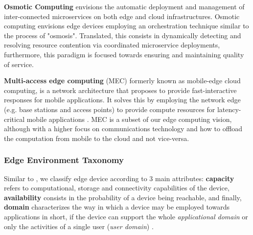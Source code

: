 \textbf{Osmotic Computing} \cite{villari2016osmotic} envisions the automatic deployment and management of inter-connected microservices on both edge and cloud infrastructures. Osmotic computing envisions edge devices employing an orchestration technique similar to the process of "osmosis". Translated, this consists in dynamically detecting and resolving resource contention via coordinated microservice deployments, furthermore, this paradigm is focused towards ensuring and maintaining quality of service.

\textbf{Multi-access edge computing} (MEC) formerly known as mobile-edge cloud computing, is a network architecture that proposes to provide fast-interactive responses for mobile applications. It solves this by employing the network edge (e.g. base stations and access points) to provide compute resources for latency-critical mobile applications \cite{mobile_edge_cloud}. MEC is a subset of our edge computing vision, although with a higher focus on communications technology and how to offload the computation from mobile to the cloud and not vice-versa. 

\subsubsection{Edge Environment Taxonomy} \label{subsec:edge_taxonomy}

Similar to \cite{Leitao2018}, we classify edge device according to 3 main attributes: \textbf{capacity} refers to computational, storage and connectivity capabilities of the device,  \textbf{availability} consists in the probability of a device being reachable, and finally, \textbf{domain} characterizes the way in which a device may be employed towards applications in short, if the device can support the whole \textit{applicational domain} or only the activities of a single user (\textit{user domain}) .

